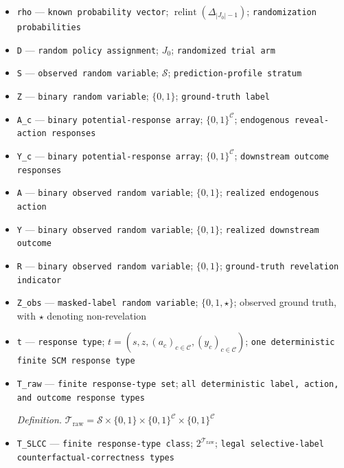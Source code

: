 \documentclass{article}
\begin{document}
\begin{itemize}
  \item \texttt{rho} --- \texttt{known probability vector}; \(\operatorname{relint}(\Delta_{|J_{0}|-1})\); \texttt{randomization probabilities}
  \item \texttt{D} --- \texttt{random policy assignment}; \(J_{0}\); \texttt{randomized trial arm}
  \item \texttt{S} --- \texttt{observed random variable}; \(\mathcal S\); \texttt{prediction-\allowbreak{}profile stratum}
  \item \texttt{Z} --- \texttt{binary random variable}; \(\{0,1\}\); \texttt{ground-\allowbreak{}truth label}
  \item \texttt{A\_\allowbreak{}c} --- \texttt{binary potential-\allowbreak{}response array}; \(\{0,1\}^{\mathcal C}\); \texttt{endogenous reveal-\allowbreak{}action responses}
  \item \texttt{Y\_\allowbreak{}c} --- \texttt{binary potential-\allowbreak{}response array}; \(\{0,1\}^{\mathcal C}\); \texttt{downstream outcome responses}
  \item \texttt{A} --- \texttt{binary observed random variable}; \(\{0,1\}\); \texttt{realized endogenous action}
  \item \texttt{Y} --- \texttt{binary observed random variable}; \(\{0,1\}\); \texttt{realized downstream outcome}
  \item \texttt{R} --- \texttt{binary observed random variable}; \(\{0,1\}\); \texttt{ground-\allowbreak{}truth revelation indicator}
  \item \texttt{Z\_\allowbreak{}obs} --- \texttt{masked-\allowbreak{}label random variable}; \(\{0,1,\star\}\); observed ground truth, with \(\star\) denoting non-revelation
  \item \texttt{t} --- \texttt{response type}; \(t=(s,z,(a_c)_{c\in\mathcal C},(y_c)_{c\in\mathcal C})\); \texttt{one deterministic finite SCM response type}
  \item \texttt{T\_\allowbreak{}raw} --- \texttt{finite response-\allowbreak{}type set}; \texttt{all deterministic label,\allowbreak{} action,\allowbreak{} and outcome response types}
  \par\smallskip\noindent\emph{Definition.} \(\mathcal T_{\mathrm{raw}}=\mathcal S\times\{0,1\}\times\{0,1\}^{\mathcal C}\times\{0,1\}^{\mathcal C}\)
  \item \texttt{T\_\allowbreak{}SLCC} --- \texttt{finite response-\allowbreak{}type class}; \(2^{\mathcal T_{\mathrm{raw}}}\); \texttt{legal selective-\allowbreak{}label counterfactual-\allowbreak{}correctness types}

\end{itemize}
\end{document}

